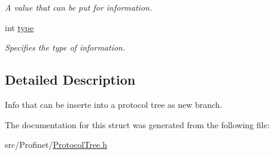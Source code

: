 \begin{DoxyCompactItemize}
\begin{DoxyCompactList}\small\item\em A value that can be put for information. \end{DoxyCompactList}\item 
\hypertarget{struct_header_info_a185f6002ab6c59872350531b5121de98}{}int \hyperlink{struct_header_info_a185f6002ab6c59872350531b5121de98}{type}\label{struct_header_info_a185f6002ab6c59872350531b5121de98}

\begin{DoxyCompactList}\small\item\em Specifies the type of information. \end{DoxyCompactList}\end{DoxyCompactItemize}


\subsection{Detailed Description}
Info that can be inserte into a protocol tree as new branch. 

The documentation for this struct was generated from the following file\+:\begin{DoxyCompactItemize}
\item 
src/\+Profinet/\hyperlink{_protocol_tree_8h}{Protocol\+Tree.\+h}\end{DoxyCompactItemize}
